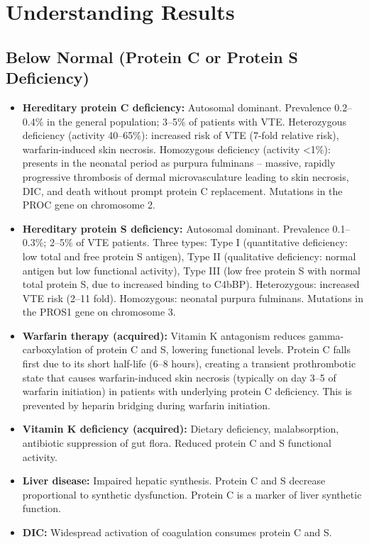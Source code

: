 \section*{Understanding Results}

\subsection*{Below Normal (Protein C or Protein S Deficiency)}
\begin{itemize}
  \item \textbf{Hereditary protein C deficiency:} Autosomal dominant. Prevalence 0.2--0.4\% in the general population; 3--5\% of patients with VTE. Heterozygous deficiency (activity 40--65\%): increased risk of VTE (7-fold relative risk), warfarin-induced skin necrosis. Homozygous deficiency (activity <1\%): presents in the neonatal period as purpura fulminans -- massive, rapidly progressive thrombosis of dermal microvasculature leading to skin necrosis, DIC, and death without prompt protein C replacement. Mutations in the PROC gene on chromosome 2.
  \item \textbf{Hereditary protein S deficiency:} Autosomal dominant. Prevalence 0.1--0.3\%; 2--5\% of VTE patients. Three types: Type I (quantitative deficiency: low total and free protein S antigen), Type II (qualitative deficiency: normal antigen but low functional activity), Type III (low free protein S with normal total protein S, due to increased binding to C4bBP). Heterozygous: increased VTE risk (2--11 fold). Homozygous: neonatal purpura fulminans. Mutations in the PROS1 gene on chromosome 3.
  \item \textbf{Warfarin therapy (acquired):} Vitamin K antagonism reduces gamma-carboxylation of protein C and S, lowering functional levels. Protein C falls first due to its short half-life (6--8 hours), creating a transient prothrombotic state that causes warfarin-induced skin necrosis (typically on day 3--5 of warfarin initiation) in patients with underlying protein C deficiency. This is prevented by heparin bridging during warfarin initiation.
  \item \textbf{Vitamin K deficiency (acquired):} Dietary deficiency, malabsorption, antibiotic suppression of gut flora. Reduced protein C and S functional activity.
  \item \textbf{Liver disease:} Impaired hepatic synthesis. Protein C and S decrease proportional to synthetic dysfunction. Protein C is a marker of liver synthetic function.
  \item \textbf{DIC:} Widespread activation of coagulation consumes protein C and S.

\end{itemize}
